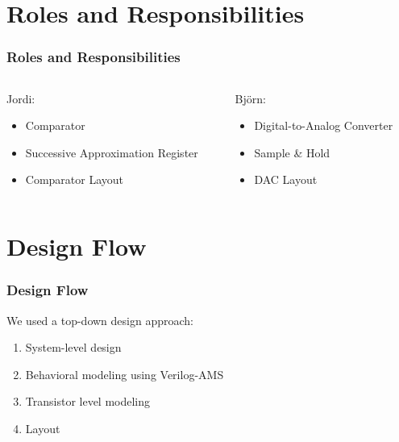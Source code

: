 \documentclass{beamer}
\begin{document}
  \section{Roles and Responsibilities}
  \begin{frame}
    \frametitle{Roles and Responsibilities}
    \begin{columns}
    \begin{column}{0.5\textwidth}
    Jordi:
    \begin{itemize}
    \item Comparator
    \item Successive Approximation Register
    \item Comparator Layout
    \end{itemize}
    \end{column}
    \begin{column}{0.5\textwidth}
    Björn:
    \begin{itemize}
    \item Digital-to-Analog Converter
    \item Sample \& Hold
    \item DAC Layout
    \end{itemize}
    \end{column}
    \end{columns}
  \end{frame}

  \section{Design Flow}
    \begin{frame}
    \frametitle{Design Flow}
    We used a top-down design approach:
    \vspace{2em}
    \begin{enumerate}
      \item System-level design
      \item Behavioral modeling using Verilog-AMS
      \item Transistor level modeling
      \item Layout
    \end{enumerate}
    \vspace{2em}
  \end{frame}
\end{document}
